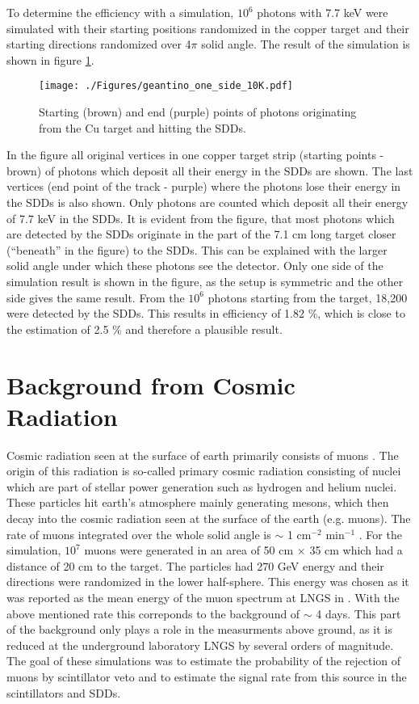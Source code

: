 To determine the efficiency with a simulation, $10^6$ photons with 7.7 keV were simulated with their starting positions randomized in the copper target and their starting directions randomized over 4$\pi$ solid angle. The result of the simulation is shown in figure \ref{fig:eff_simulation}.
\begin{figure}[h]
 \centering
 \texttt{[image: ./Figures/geantino\_one\_side\_10K.pdf]}
 \caption{Starting (brown) and end (purple) points of photons originating from the Cu target and hitting the SDDs.}
 \label{fig:eff_simulation}
\end{figure}
In the figure all original vertices in one copper target strip (starting points - brown) of photons which deposit all their energy in the SDDs are shown. The last vertices (end point of the track - purple) where the photons lose their energy in the SDDs is also shown. Only photons are counted which deposit all their energy of 7.7 keV in the SDDs. It is evident from the figure, that most photons which are detected by the SDDs originate in the part of the 7.1 cm long target closer (``beneath'' in the figure) to the SDDs. This can be explained with the larger solid angle under which these photons see the detector. Only one side of the simulation result is shown in the figure, as the setup is symmetric and the other side gives the same result. From the $10^6$ photons starting from the target, 18,200 were detected by the SDDs. This results in efficiency of 1.82 \%, which is close to the estimation of 2.5 \% and therefore a plausible result.

\section{Background from Cosmic Radiation}

Cosmic radiation seen at the surface of earth primarily consists of muons \cite{Gaisser2000}. The origin of this radiation is so-called primary cosmic radiation consisting of nuclei which are part of  stellar power generation such as hydrogen and helium nuclei. These particles hit earth's atmosphere mainly generating mesons, which then decay into the cosmic radiation seen at the surface of the earth (e.g. muons). The rate of muons integrated over the whole solid angle is $\sim$ 1 cm$^{-2}$ min$^{-1}$ \cite{Gaisser2000}. For the simulation, $10^{7}$ muons were generated in an area of 50 cm $\times$ 35 cm which had a distance of 20 cm to the target. The particles had 270 GeV energy and their directions were randomized in the lower half-sphere. This energy was chosen as it was reported as the mean energy of the muon spectrum at LNGS in \cite{Ambrosio2003}. With the above mentioned rate this correponds to the background of $\sim$ 4 days. This part of the background only plays a role in the measurments above ground, as it is reduced at the underground laboratory LNGS by several orders of magnitude. The goal of these simulations was to estimate the probability of the rejection of muons by scintillator veto and to estimate the signal rate from this source in the scintillators and SDDs.

